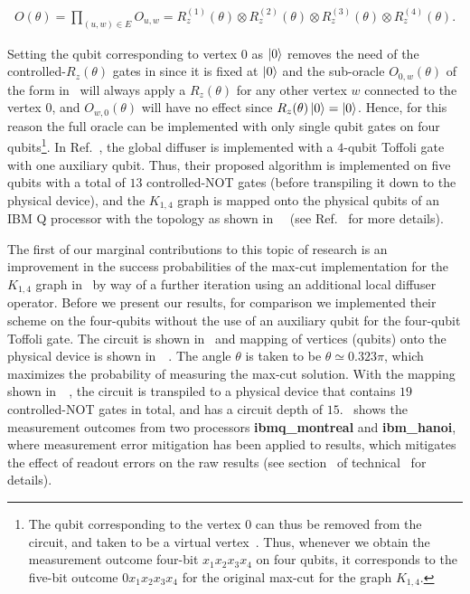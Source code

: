 \begin{align}
	O(\theta)=\displaystyle\prod_{(u,w) \in E}O_{u,w} = R_z^{(1)}(\theta) \otimes R_z^{(2)}(\theta) \otimes R_z^{(3)}(\theta) \otimes R_z^{(4)}(\theta).
\end{align}

\noindent
Setting the qubit corresponding to vertex $0$ as $\ket{0}$ removes the need of the controlled-$R_z(\theta)$ gates in since it is fixed at $\ket{0}$ and the sub-oracle $O_{0,w}(\theta)$ of the form in~ will always apply a $R_z(\theta)$ for any other vertex $w$ connected to the vertex $0$, and $O_{w,0}(\theta)$ will have no effect since $R_z(\theta)\ket{0}=\ket{0}$. Hence, for this reason the full oracle can be implemented with only single qubit gates on four qubits\footnote[][-30pt]{The qubit corresponding to the vertex $0$ can thus be removed from the circuit, and taken to be a virtual vertex~\cite{Satoh_2020}. Thus, whenever we obtain the measurement outcome four-bit $x_1x_2x_3x_4$ on four qubits, it corresponds to the five-bit outcome $0x_1x_2x_3x_4$ for the original \acs{max-cut} for the graph $K_{1,4}$.}. In Ref.~\cite{Satoh_2020}, the global diffuser is implemented with a $4$-qubit Toffoli gate with one auxiliary qubit. Thus, their proposed algorithm is implemented on five qubits with a total of $13$ controlled-NOT gates (before transpiling it down to the physical device), and the $K_{1,4}$ graph is mapped onto the physical qubits of an IBM Q processor with the topology as shown in~~ (see Ref.~\cite{Satoh_2020} for more details). 

\bigskip
\noindent
The first of our marginal contributions to this topic of research is an improvement in the success probabilities of the \acs{max-cut} implementation for the $K_{1,4}$ graph in~\cite{Satoh_2020} by way of a further iteration using an additional local diffuser operator. Before we present our results, for comparison we implemented their scheme on the four-qubits without the use of an auxiliary qubit for the four-qubit Toffoli gate. The circuit is shown in~  and mapping of vertices (qubits) onto the physical device is shown in~~. The angle $\theta$ is taken to be $\theta \simeq 0.323\pi$, which maximizes the probability of measuring the \acs{max-cut} solution. With the mapping shown in~~, the circuit is transpiled to a physical device that contains $19$ controlled-NOT gates in total, and has a circuit depth of $15$.~ shows the measurement outcomes from two processors \textbf{ibmq\_montreal} and \textbf{ibm\_hanoi}, where measurement error mitigation has been applied to results, which mitigates the effect of readout errors on the raw results (see section~ of technical~ for details). 

